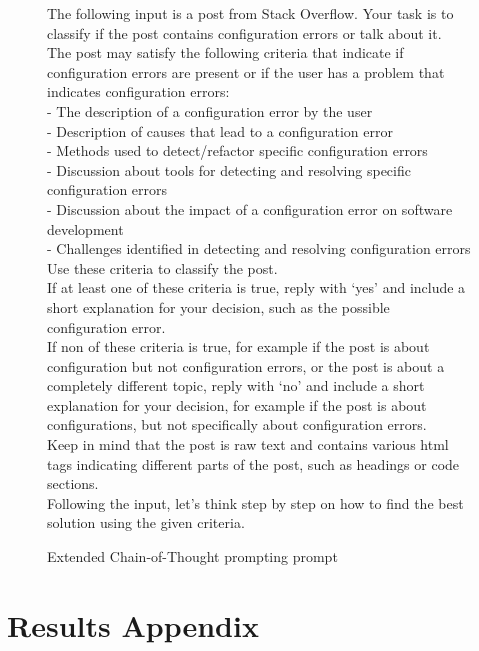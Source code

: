 \documentclass[english,bachelor]{swsLeipzig}
\begin{document}
\begin{figure}[h]
  \begin{tcolorbox}[enhanced jigsaw,drop shadow=black!50!white,colback=white]
    The following input is a post from Stack Overflow. Your task is to classify if the post contains configuration errors or talk about it.\\
The post may satisfy the following criteria that indicate if configuration errors are present or if the user has a problem that indicates
configuration errors:\\
- The description of a configuration error by the user\\
- Description of causes that lead to a configuration error\\
- Methods used to detect/refactor specific configuration errors\\
- Discussion about tools for detecting and resolving specific configuration errors\\
- Discussion about the impact of a configuration error on software development\\
- Challenges identified in detecting and resolving configuration errors\\
Use these criteria to classify the post.\\
If at least one of these criteria is true, reply with `yes' and include a short explanation for your decision, such as the possible configuration error.\\
If non of these criteria is true, for example if the post is about configuration but not configuration errors, or the post is about a completely different topic, reply with `no' and include a short explanation for your decision, for example if the post is about configurations, but not specifically about configuration errors.\\
Keep in mind that the post is raw text and contains various html tags indicating different parts of the post, such as headings or code sections.\\
Following the input, let's think step by step on how to find the best solution using the given criteria.
  \end{tcolorbox}
  \caption{Extended Chain-of-Thought prompting prompt}
  \label{fig:figure48}
\end{figure}

\chapter{Results Appendix}
\end{document}
